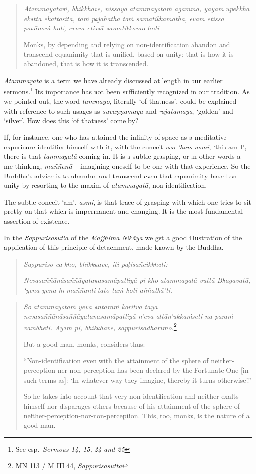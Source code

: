\begin{quote}
\emph{Atammayataṁ, bhikkhave, nissāya atammayataṁ āgamma, yāyam upekkhā ekattā ekattasitā, taṁ pajahatha taṁ samatikkamatha, evam etissā pahānaṁ hoti, evam etissā samatikkamo hoti.}

Monks, by depending and relying on non-identification abandon and transcend equanimity that is unified, based on unity; that is how it is abandoned, that is how it is transcended.
\end{quote}

\emph{Atammayatā} is a term we have already discussed at length in our earlier sermons.\footnote{See esp.~\emph{Sermons 14, 15, 24 and 25}} Its importance has not been sufficiently recognized in our tradition. As we pointed out, the word \emph{tammayo}, literally `of thatness', could be explained with reference to such usages as \emph{suvaṇṇamaya} and \emph{rajatamaya}, `golden' and `silver'. How does this `of thatness' come by?

If, for instance, one who has attained the infinity of space as a meditative experience identifies himself with it, with the conceit \emph{eso 'ham asmi}, `this am I', there is that \emph{tammayatā} coming in. It is a subtle grasping, or in other words a me-thinking, \emph{maññanā} -- imagining oneself to be one with that experience. So the Buddha's advice is to abandon and transcend even that equanimity based on unity by resorting to the maxim of \emph{atammayatā}, non-identification.

The subtle conceit `am', \emph{asmi}, is that trace of grasping with which one tries to sit pretty on that which is impermanent and changing. It is the most fundamental assertion of existence.

In the \emph{Sappurisasutta} of the \emph{Majjhima Nikāya} we get a good illustration of the application of this principle of detachment, made known by the Buddha.

\begin{quote}
\emph{Sappuriso ca kho, bhikkhave, iti paṭisañcikkhati:}

\emph{Nevasaññānāsaññāyatanasamāpattiyā pi kho atammayatā vuttā Bhagavatā, `yena yena hi maññanti tato taṁ hoti aññathā'ti.}
\end{quote}

\begin{quote}
\emph{So atammayataṁ yeva antaraṁ karitvā tāya nevasaññānāsaññāyatanasamāpattiyā n'eva attān'ukkaṁseti na paraṁ vambheti. Ayam pi, bhikkhave, sappurisadhammo.}\footnote{\href{https://suttacentral.net/mn113/pli/ms}{MN 113 / M III 44}, \emph{Sappurisasutta}}

But a good man, monks, considers thus:

``Non-identification even with the attainment of the sphere of neither-perception-nor-non-perception has been declared by the Fortunate One {[}in such terms as{]}: `In whatever way they imagine, thereby it turns otherwise'.''

So he takes into account that very non-identification and neither exalts himself nor disparages others because of his attainment of the sphere of neither-perception-nor-non-perception. This, too, monks, is the nature of a good man.
\end{quote}

